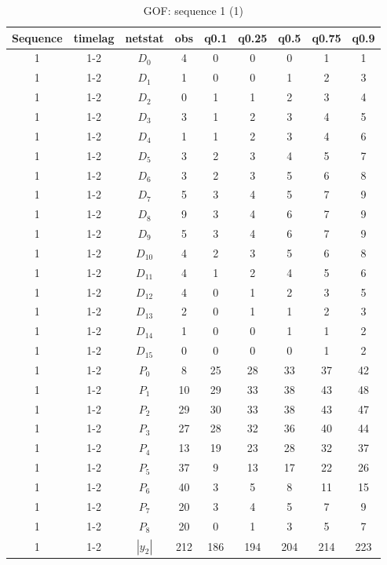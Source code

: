 \documentclass[aspectratio=169,ignorenonframetext,9pt]{beamer}
\theoremstyle{plain}
\theoremstyle{definition}
\begin{document}
\begin{table}[h!]
    \centering
        \begin{tabular}{c| c | c | c | c |c |c |c |c }
            Sequence& timelag & netstat & obs & q0.1 & q0.25 & q0.5 & q0.75 & q0.9 \\
            \hline \hline
            1 & 1-2 & $D_0$ & 4 &  0& 0& 0& 1& 1 \\
            1 & 1-2 & $D_1$ & 1 &  0& 0& 1& 2& 3 \\
            1 & 1-2 & $D_2$ & 0 &  1& 1& 2& 3& 4 \\
            1 & 1-2 & $D_3$ & 3 &  1& 2& 3& 4& 5 \\
            1 & 1-2 & $D_4$ & 1 &  1& 2& 3& 4& 6 \\
            1 & 1-2 & $D_5$ & 3 &  2& 3& 4& 5& 7 \\
            1 & 1-2 & $D_6$ & 3 &  2& 3& 5& 6& 8 \\
            1 & 1-2 & $D_7$ & 5 &  3& 4& 5& 7& 9 \\
            1 & 1-2 & $D_8$ & 9 &  3& 4& 6& 7& 9 \\
            1 & 1-2 & $D_9$ & 5 &  3& 4& 6& 7& 9 \\
            1 & 1-2 & $D_{10}$ & 4 &  2& 3& 5& 6& 8 \\
            1 & 1-2 & $D_{11}$ & 4 &  1& 2& 4& 5& 6 \\
            1 & 1-2 & $D_{12}$ & 4 &  0& 1& 2& 3& 5 \\
            1 & 1-2 & $D_{13}$ & 2 &  0& 1& 1& 2& 3 \\
            1 & 1-2 & $D_{14}$ & 1 &  0& 0& 1& 1& 2 \\
            1 & 1-2 & $D_{15}$ & 0 &  0& 0& 0& 1& 2 \\
            1 & 1-2 & $P_0$ & 8 &  25& 28& 33& 37& 42 \\
            1 & 1-2 & $P_1$ & 10 & 29& 33& 38& 43& 48 \\
            1 & 1-2 & $P_2$ & 29 & 30& 33& 38& 43& 47 \\
            1 & 1-2 & $P_3$ & 27 & 28& 32& 36& 40& 44 \\
            1 & 1-2 & $P_4$ & 13 & 19& 23& 28& 32& 37 \\
            1 & 1-2 & $P_5$ & 37 &  9& 13& 17& 22& 26 \\
            1 & 1-2 & $P_6$ & 40 &  3& 5& 8& 11& 15 \\
            1 & 1-2 & $P_7$ & 20 &  3& 4& 5& 7& 9 \\
            1 & 1-2 & $P_8$ & 20 &  0& 1& 3& 5& 7 \\
            1 & 1-2 & $|y_2|$ & 212 &  186& 194& 204& 214& 223 \\
        \end{tabular}
        \caption{GOF: sequence 1 (1)}
    \end{table}
\end{document}
